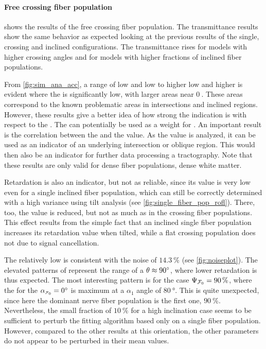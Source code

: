 \paragraph{Free crossing fiber population}
 shows the results of the free crossing fiber population.
The transmittance results show the same behavior as expected looking at the previous results of the single, crossing and inclined configurations.
The transmittance rises for models with higher crossing angles and for models with higher fractions of inclined fiber populations.
\par
%
From \ref{fig:sim_ana_acc}, a range of low \modelPsi{} and low \modelInc{} to higher low \modelPsi{} and higher \modelInc{} is evident where the \accvalue{} is significantly low, with larger areas near $\SI{0}{}$.
These areas correspond to the known problematic areas in intersections and inclined regions.
However, these results give a better idea of how strong the indication is with respect to the \accvalue{}.
The \accvalue{} can potentially be used as a weight for .
An important result is the correlation between the \accvalue{} and the \trel{} value.
As the \trel{} value is analyzed, it can be used as an indicator of an underlying intersection or oblique region.
This would then also be an indicator for further data processing \eg{} a tractography.
Note that these results are only valid for dense fiber populations, \ie{} dense white matter.
\par
%
Retardation is also an indicator, but not as reliable, since its value is very low even for a single inclined fiber population, which can still be correctly determined with a high variance using tilt analysis (see \cref{fig:single_fiber_pop_rofl}).
There, too, the \trel{} value is reduced, but not as much as in the crossing fiber populations.
This effect results from the simple fact that an inclined single fiber population increases its retardation value when tilted, while a flat crossing population does not due to signal cancellation.
\par
%
The relatively low \rvalue{} is consistent with the noise of $\SI{14.3}{\percent}$ (see \cref{fig:noiseplot}).
The elevated patterns of \rvalue{} represent the range of a $\textnormal{$\theta$} \approx \SI{90}{\degree}$, where lower retardation is thus expected.
The most interesting pattern is for the case $\textnormal{$\Psi_{\textnormal{$\mathcal{F}_0$}}$} = \SI{90}{\percent}$, where the \rvalue{} for the $\modelInc = \SI{0}{\degree}$ is maximum at a $\alpha_1$  angle of $\SI{80}{\degree}$.
This is quite unexpected, since here the dominant nerve fiber population is the first one, \ie{} $\SI{90}{\percent}$.
Nevertheless, the small fraction of $\SI{10}{\percent}$ for a high inclination case seems to be sufficient to perturb the fitting algorithm based only on a single fiber population.
However, compared to the other results at this orientation, the other parameters do not appear to be perturbed in their mean values.
% 
%
%
